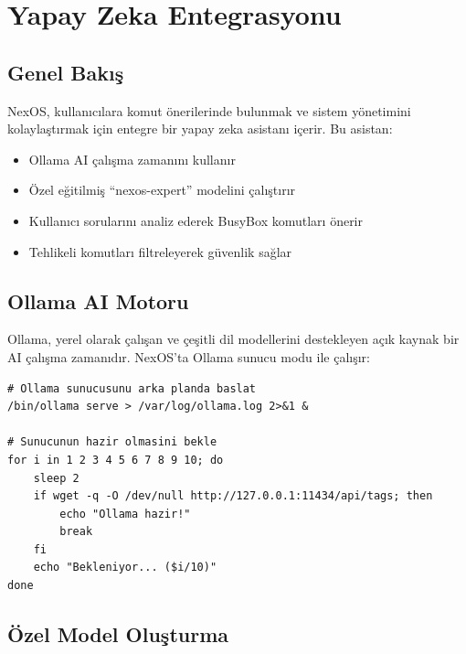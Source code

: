 \documentclass[12pt,a4paper]{report}
\begin{document}
\chapter{Yapay Zeka Entegrasyonu}

\section{Genel Bakış}

NexOS, kullanıcılara komut önerilerinde bulunmak ve sistem yönetimini kolaylaştırmak için entegre bir yapay zeka asistanı içerir. Bu asistan:

\begin{itemize}
    \item Ollama AI çalışma zamanını kullanır
    \item Özel eğitilmiş ``nexos-expert'' modelini çalıştırır
    \item Kullanıcı sorularını analiz ederek BusyBox komutları önerir
    \item Tehlikeli komutları filtreleyerek güvenlik sağlar
\end{itemize}

\section{Ollama AI Motoru}

Ollama, yerel olarak çalışan ve çeşitli dil modellerini destekleyen açık kaynak bir AI çalışma zamanıdır. NexOS'ta Ollama sunucu modu ile çalışır:

\begin{lstlisting}[style=bashstyle,caption={Ollama Sunucu Baslatma}]
# Ollama sunucusunu arka planda baslat
/bin/ollama serve > /var/log/ollama.log 2>&1 &

# Sunucunun hazir olmasini bekle
for i in 1 2 3 4 5 6 7 8 9 10; do
    sleep 2
    if wget -q -O /dev/null http://127.0.0.1:11434/api/tags; then
        echo "Ollama hazir!"
        break
    fi
    echo "Bekleniyor... ($i/10)"
done
\end{lstlisting}

\section{Özel Model Oluşturma}
\end{document}
